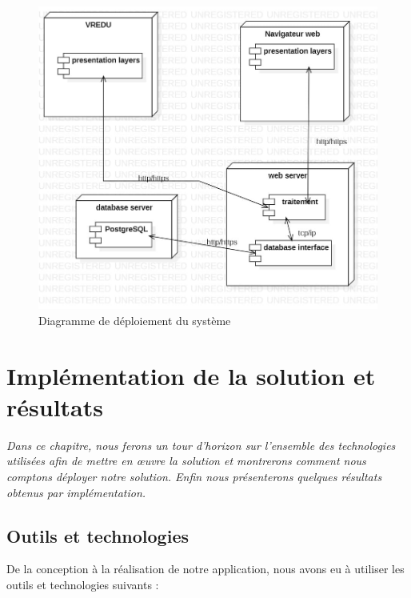 \begin{figure}[H]
	\centering
	\includegraphics[width=1\textwidth]{img/dd}
	\caption{Diagramme de déploiement du système}
	\label{fig:mesh1}
\end{figure}

\chapter{Implémentation de la solution et résultats}
\textit{Dans ce chapitre, nous ferons un tour d’horizon sur l’ensemble des technologies utilisées
	afin de mettre en œuvre la solution et montrerons comment nous comptons déployer notre
	solution. Enfin nous présenterons quelques résultats obtenus par implémentation.}
\clearpage

\section{Outils et technologies}

De la conception à la réalisation de notre application, nous avons eu à utiliser les outils et technologies suivants :

